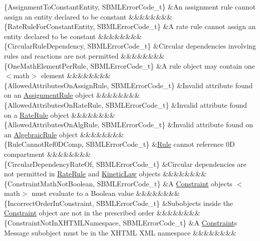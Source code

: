 \begin{DoxyParagraph}{}
\begin{longtabu}
\{Assignment\+To\+Constant\+Entity, S\+B\+M\+L\+Error\+Code\+\_\+t\} &An assignment rule cannot assign an entity declared to be constant &&&&&&&&\\
\{Rate\+Rule\+For\+Constant\+Entity, S\+B\+M\+L\+Error\+Code\+\_\+t\} &A rate rule cannot assign an entity declared to be constant &&&&&&&&\\
\{Circular\+Rule\+Dependency, S\+B\+M\+L\+Error\+Code\+\_\+t\} &Circular dependencies involving rules and reactions are not permitted &&&&&&&&\\
\{One\+Math\+Element\+Per\+Rule, S\+B\+M\+L\+Error\+Code\+\_\+t\} &A rule object may contain one {\ttfamily $<$math$>$} element &&&&&&&&\\
\{Allowed\+Attributes\+On\+Assign\+Rule, S\+B\+M\+L\+Error\+Code\+\_\+t\} &Invalid attribute found on an \hyperlink{class_assignment_rule}{Assignment\+Rule} object &&&&&&&&\\
\{Allowed\+Attributes\+On\+Rate\+Rule, S\+B\+M\+L\+Error\+Code\+\_\+t\} &Invalid attribute found on a \hyperlink{class_rate_rule}{Rate\+Rule} object &&&&&&&&\\
\{Allowed\+Attributes\+On\+Alg\+Rule, S\+B\+M\+L\+Error\+Code\+\_\+t\} &Invalid attribute found on an \hyperlink{class_algebraic_rule}{Algebraic\+Rule} object &&&&&&&&\\
\{Rule\+Cannot\+Ref0\+D\+Comp, S\+B\+M\+L\+Error\+Code\+\_\+t\} &\hyperlink{class_rule}{Rule} cannot reference 0D compartment &&&&&&&&\\
\{Circular\+Dependency\+Rate\+Of, S\+B\+M\+L\+Error\+Code\+\_\+t\} &Circular dependencies are not permitted in \hyperlink{class_rate_rule}{Rate\+Rule} and \hyperlink{class_kinetic_law}{Kinetic\+Law} objects &&&&&&&&\\
\{Constraint\+Math\+Not\+Boolean, S\+B\+M\+L\+Error\+Code\+\_\+t\} &A \hyperlink{class_constraint}{Constraint} object\textquotesingle{}s {\ttfamily $<$math$>$} must evaluate to a Boolean value &&&&&&&&\\
\{Incorrect\+Order\+In\+Constraint, S\+B\+M\+L\+Error\+Code\+\_\+t\} &Subobjects inside the \hyperlink{class_constraint}{Constraint} object are not in the prescribed order &&&&&&&&\\
\{Constraint\+Not\+In\+X\+H\+T\+M\+L\+Namespace, S\+B\+M\+L\+Error\+Code\+\_\+t\} &A \hyperlink{class_constraint}{Constraint}\textquotesingle{}s Message subobject must be in the X\+H\+T\+ML X\+ML namespace &&&&&&&&\\

\end{longtabu}
\end{DoxyParagraph}
